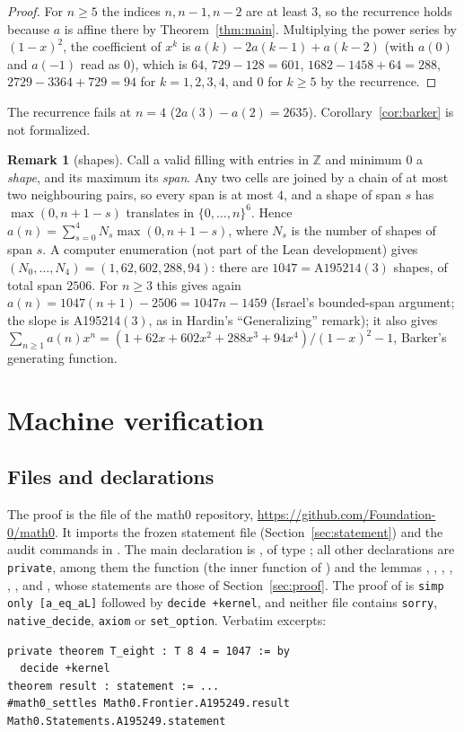 \documentclass[11pt]{amsart}
\theoremstyle{plain}
\theoremstyle{definition}
\newtheorem{remark}[theorem]{Remark}
\newcommand{\Z}{\mathbb{Z}}
\begin{document}
\begin{proof}
For $n\ge5$ the indices $n,n-1,n-2$ are at least $3$, so the recurrence holds because $a$ is affine there by Theorem~\ref{thm:main}. Multiplying the power series by $(1-x)^2$, the coefficient of $x^k$ is $a(k)-2a(k-1)+a(k-2)$ (with $a(0)$ and $a(-1)$ read as $0$), which is $64$, $729-128=601$, $1682-1458+64=288$, $2729-3364+729=94$ for $k=1,2,3,4$, and $0$ for $k\ge5$ by the recurrence.
\end{proof}

The recurrence fails at $n=4$ ($2a(3)-a(2)=2635$). Corollary~\ref{cor:barker} is not formalized.

\begin{remark}[shapes]\label{rem:shapes}
Call a valid filling with entries in $\Z$ and minimum $0$ a \emph{shape}, and its maximum its \emph{span}. Any two cells are joined by a chain of at most two neighbouring pairs, so every span is at most $4$, and a shape of span $s$ has $\max(0,n+1-s)$ translates in $\{0,\dots,n\}^6$. Hence $a(n)=\sum_{s=0}^{4}N_s\max(0,n+1-s)$, where $N_s$ is the number of shapes of span $s$. A computer enumeration (not part of the Lean development) gives $(N_0,\dots,N_4)=(1,62,602,288,94)$: there are $1047=\text{A195214}(3)$ shapes, of total span $2506$. For $n\ge3$ this gives again $a(n)=1047(n+1)-2506=1047n-1459$ (Israel's bounded-span argument; the slope is A195214$(3)$, as in Hardin's ``Generalizing'' remark); it also gives $\sum_{n\ge1}a(n)x^n=(1+62x+602x^2+288x^3+94x^4)/(1-x)^2-1$, Barker's generating function.
\end{remark}

\section{Machine verification}\label{sec:lean}

\subsection*{Files and declarations}
The proof is the file  of the math0 repository, \url{https://github.com/Foundation-0/math0}. It imports the frozen statement file (Section~\ref{sec:statement}) and the audit commands in . The main declaration is , of type ; all other declarations are \texttt{private}, among them the function  (the inner function of ) and the lemmas , , , , , ,  and , whose statements are those of Section~\ref{sec:proof}. The proof of  is \texttt{simp only [a\_eq\_aL]} followed by \texttt{decide +kernel}, and neither file contains \texttt{sorry}, \texttt{native\_decide}, \texttt{axiom} or \texttt{set\_option}. Verbatim excerpts:
\begin{lstlisting}
private theorem T_eight : T 8 4 = 1047 := by
  decide +kernel
theorem result : statement := ...
#math0_settles Math0.Frontier.A195249.result Math0.Statements.A195249.statement
\end{lstlisting}
\end{document}
